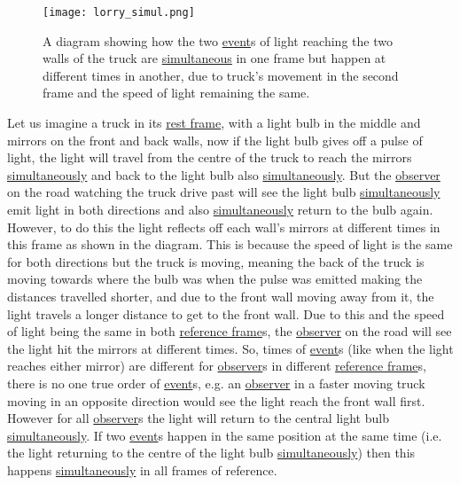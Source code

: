 \begin{figure}[htbp]
\centering
       \texttt{[image: lorry\_simul.png]}
    \caption{A diagram showing how the two \protect\hyperlink{def-event}{event}s of light reaching the two walls of the truck are \protect\hyperlink{def-simultaneity}{simultaneous} in one frame but happen at different times in another, due to truck's movement in the second frame and the speed of light remaining the same.}
    \label{fig: truck simultaneity}
\end{figure}

Let us imagine a truck in its \hyperlink{def-proper-frame}{rest frame}, with a light bulb in the middle and mirrors on the front and back walls, now if the light bulb gives off a pulse of light, the light will travel from the centre of the truck to reach the mirrors \hyperlink{def-simultaneity}{simultaneously} and back to the light bulb also \hyperlink{def-simultaneity}{simultaneously}. 
But the \hyperlink{def-observer}{observer} on the road watching the truck drive past will see the light bulb \hyperlink{def-simultaneity}{simultaneously} emit light in both directions and also \hyperlink{def-simultaneity}{simultaneously} return to the bulb again. However, to do this the light reflects off each wall's mirrors at different times in this frame as shown in the diagram. This is because the speed of light is the same for both directions but the truck is moving, meaning the back of the truck is moving towards where the bulb was when the pulse was emitted making the distances travelled shorter, and due to the front wall moving away from it, the light travels a longer distance to get to the front wall. Due to this and the speed of light being the same in both \hyperlink{def-Reference-frame}{reference frame}s, the \hyperlink{def-observer}{observer} on the road will see the light hit the mirrors at different times.
So, times of \hyperlink{def-event}{event}s (like when the light reaches either mirror) are different for \hyperlink{def-observer}{observer}s in different \hyperlink{def-Reference-frame}{reference frame}s, there is no one true order of \hyperlink{def-event}{event}s, e.g. an \hyperlink{def-observer}{observer} in a faster moving truck moving in an opposite direction would see the light reach the front wall first.
However for all \hyperlink{def-observer}{observer}s the light will return to the central light bulb \hyperlink{def-simultaneity}{simultaneously}. If two \hyperlink{def-event}{event}s happen in the same position at the same time (i.e. the light returning to the centre of the light bulb \hyperlink{def-simultaneity}{simultaneously}) then this happens \hyperlink{def-simultaneity}{simultaneously} in all frames of reference. 

